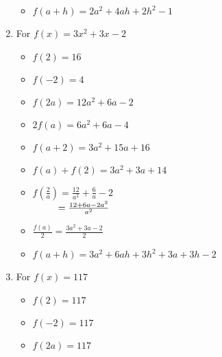 \documentclass{ximera}
\begin{document}
\begin{enumerate}
\begin{itemize}
 

 


\item  $f(a + h) = 2a^2+4ah+2h^2-1$

\end{itemize}



\item For $f(x) = 3x^2+3x-2$


\begin{itemize}

\item  $f(2) = 16$
\item  $f(-2) = 4$
\item  $f(2a) = 12a^2+6a-2$

\end{itemize}


\begin{itemize}

\item  $2 f(a) = 6a^2+6a-4$
\item $f(a+2) = 3a^2+15a+16$
\item \small $f(a) + f(2) = 3a^2+3a+14$ \normalsize

\end{itemize}


\begin{itemize}

\item  $f \left( \frac{2}{a} \right) = \frac{12}{a^2} + \frac{6}{a} - 2$ \\
$\hphantom{f \left( \frac{2}{a} \right)} = \frac{12+6a-2a^2}{a^2}$

 

 

\item $\frac{f(a)}{2} =  \frac{3a^2+3a-2}{2}$

 

 


\item  $f(a + h) = 3a^2 + 6ah + 3h^2+3a+3h-2$

\end{itemize}



\item For $f(x) = 117$


\begin{itemize}

\item  $f(2) = 117$
\item  $f(-2) = 117$
\item  $f(2a) = 117$


\end{itemize}
\end{enumerate}
\end{document}
